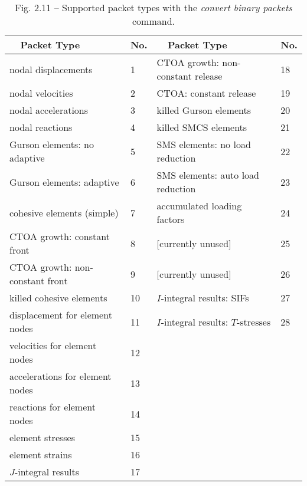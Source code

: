 \documentclass[11pt]{report}
\numberwithin{equation}{section}
\newcommand{\ti}{\emph}
\begin{document}
\begin{table}[htb]
\centering
\setlength{\extrarowheight}{5.0pt}
\small
\begin{tabular}[htb] { | p{2.2 in} | p{0.3 in} ||  p{2.2 in} | p{0.3 in} | }
\hline
\ \  Packet Type &  No. &  \ \  Packet Type &  No.  \\
\hline 
 nodal displacements &   1 & CTOA growth: non-constant release & 18 \\
nodal velocities & 2 &  CTOA: constant release & 19 \\
nodal accelerations & 3 & killed Gurson elements & 20 \\
nodal reactions & 4 & killed SMCS elements &21 \\
Gurson elements: no adaptive & 5 & SMS elements: no load reduction & 22 \\
Gurson elements: adaptive & 6 & SMS elements: auto load reduction & 23 \\
cohesive elements (simple) & 7 &accumulated loading factors & 24 \\
CTOA growth: constant front & 8  & [currently unused] & 25 \\
CTOA growth: non-constant front & 9  & [currently unused] & 26 \\
killed cohesive elements   & 10 & $I$-integral results: SIFs & 27 \\
displacement for element nodes & 11 & $I$-integral results: $T$-stresses & 28 \\
velocities for element nodes & 12 & \ \ & \ \\
accelerations for element nodes & 13 & \ \ & \ \\
reactions for element nodes & 14 & \ \ & \ \\
element stresses & 15 & \ & \ \\
element strains & 16 & \ & \ \\
$J$-integral results & 17 & \ & \ \\
\hline
\end{tabular}
\caption{\small Fig. 2.11 -- Supported packet types with the \ti{convert binary packets} command.}
\normalsize
\end{table}
\end{document}
